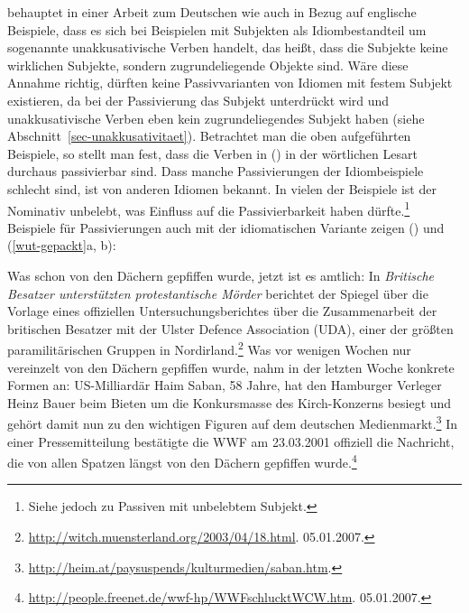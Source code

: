 \citet[]{Scherpenisse86a} behauptet in einer Arbeit zum Deutschen wie auch \citet{Marantz84a}
in Bezug auf englische Beispiele,
dass es sich bei Beispielen mit Subjekten als Idiombestandteil um sogenannte unakkusativische Verben
handelt, das heißt, dass die Subjekte keine wirklichen Subjekte,
sondern zugrundeliegende Objekte sind. 
%
Wäre diese Annahme richtig,
dürften keine Passivvarianten von Idiomen mit festem Subjekt existieren,
da bei der Passivierung das Subjekt unterdrückt wird und unakkusativische
Verben eben kein zugrundeliegendes Subjekt haben (siehe Abschnitt~\ref{sec-unakkusativitaet}).
Betrachtet man die oben aufgeführten Beispiele, so stellt man fest, dass die Verben in
() in der wörtlichen Lesart durchaus passivierbar sind.
Dass manche Passivierungen der Idiombeispiele schlecht sind, ist
von anderen Idiomen bekannt. In vielen der Beispiele ist der Nominativ
unbelebt, was Einfluss auf die Passivierbarkeit haben dürfte.\footnote{
        Siehe jedoch  zu Passiven mit
        unbelebtem Subjekt.%
}
Beispiele für Passivierungen auch mit der idiomatischen Variante zeigen () %
und (\ref{wut-gepackt}a, b):

\eal
\ex Was schon von den Dächern gepfiffen wurde, jetzt ist es amtlich: In \emph{Britische Besatzer unterstützten protestantische Mörder} berichtet der Spiegel über die Vorlage eines offiziellen Untersuchungsberichtes über die Zusammenarbeit der britischen Besatzer mit der Ulster Defence Association (UDA), einer der größten paramilitärischen Gruppen in Nordirland.\footnote{
  \url{http://witch.muensterland.org/2003/04/18.html}. 05.01.2007.
}
\ex Was vor wenigen Wochen nur vereinzelt von den Dächern gepfiffen wurde, nahm in der letzten Woche konkrete Formen an: US-Milliardär Haim Saban, 58 Jahre, hat den Hamburger Verleger Heinz Bauer beim Bieten um die Konkursmasse des Kirch-Konzerns besiegt und gehört damit nun zu den wichtigen Figuren auf dem deutschen Medienmarkt.\footnote{
  \url{http://heim.at/paysuspends/kulturmedien/saban.htm}.
}
\ex In einer Pressemitteilung bestätigte die WWF am 23.03.2001 offiziell die Nachricht, die von allen Spatzen längst von den Dächern gepfiffen wurde.\footnote{
  \url{http://people.freenet.de/wwf-hp/WWFschlucktWCW.htm}. 05.01.2007.
}
\zl

